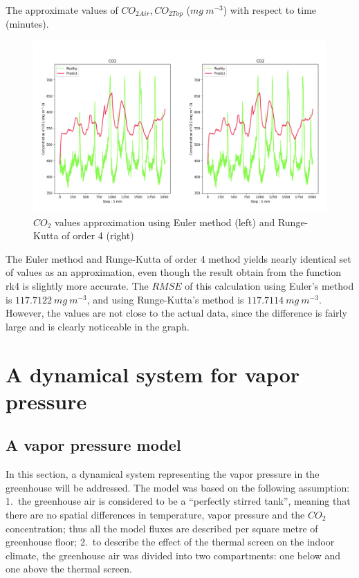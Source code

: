 \documentclass[a4paper]{article}
\numberwithin{equation}{section}
\begin{document}
The approximate values of \(CO_{2Air}, CO_{2Top}\) (\(mg\ m^{-3}\)) with respect to time (minutes).

\begin{figure}[H]
  \centering
  \includegraphics[width=\textwidth]{CO2_compare.png}
  \caption{\(CO_2\) values approximation using Euler method (left) and Runge-Kutta of order 4 (right)}
\end{figure}

The Euler method and Runge-Kutta of order 4 method yields nearly identical set of values as an approximation, even though the result obtain from the function rk4 is slightly more accurate. The \(RMSE\) of this calculation using Euler's method is \(117.7122\ mg\ m^{-3}\), and using Runge-Kutta's method is \(117.7114\ mg\ m^{-3}\). However, the values are not close to the actual data, since the difference is fairly large and is clearly noticeable in the graph.

\newpage
\section{A dynamical system for vapor pressure}
\subsection{A vapor pressure model}
In this section, a dynamical system representing the vapor pressure in the greenhouse will be addressed.
The model was based on the following assumption:
1.\ the greenhouse air is considered to be a ``perfectly stirred tank'', meaning that there are no spatial differences in temperature, vapor pressure and the \(CO_2\) concentration; thus all the model fluxes are described per square metre of greenhouse floor;
2.\ to describe the effect of the thermal screen on the indoor climate, the greenhouse air was divided into two compartments: one below and one above the thermal screen.
\end{document}
